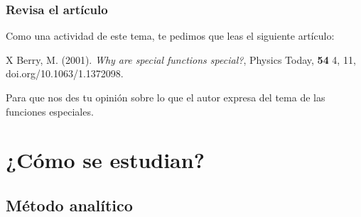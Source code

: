 \documentclass[12pt]{beamer}
\begin{document}
\begin{frame}
\frametitle{Revisa el artículo}
Como una actividad de este tema, te pedimos que leas el siguiente artículo: 
\begin{thebibliography}{X}
 Berry, M. (2001). \textit{Why are special functions special?}, Physics Today, \textbf{54} 4, 11, doi.org/10.1063/1.1372098.
\end{thebibliography}
Para que nos des tu opinión sobre lo que el autor expresa del tema de las funciones especiales.
\end{frame}

\section{¿Cómo se estudian?}
\subsection{Método analítico}
\end{document}
